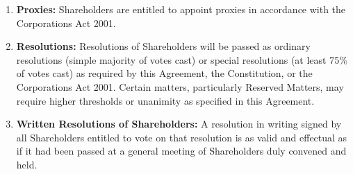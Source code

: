 \begin{enumerate}[label=(\alph*), wide, labelwidth=!, labelindent=0pt]
\item \textbf{Proxies:} Shareholders are entitled to appoint proxies in accordance with the Corporations Act 2001.
\item \textbf{Resolutions:} Resolutions of Shareholders will be passed as ordinary resolutions (simple majority of votes cast) or special resolutions (at least 75\% of votes cast) as required by this Agreement, the Constitution, or the Corporations Act 2001. Certain matters, particularly Reserved Matters, may require higher thresholds or unanimity as specified in this Agreement.
\item \textbf{Written Resolutions of Shareholders:} A resolution in writing signed by all Shareholders entitled to vote on that resolution is as valid and effectual as if it had been passed at a general meeting of Shareholders duly convened and held.
\end{enumerate}

